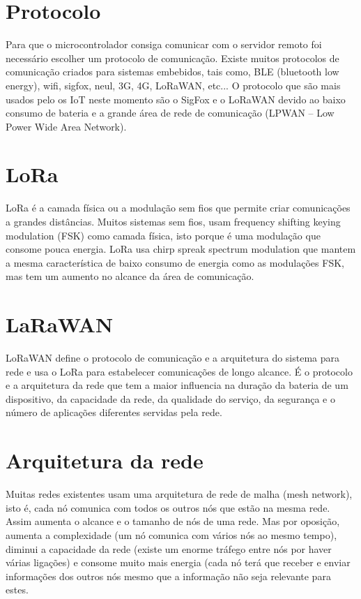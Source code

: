 \documentclass[a4paper]{article}
\begin{document}
\section{Protocolo}

Para que o microcontrolador consiga comunicar com o servidor remoto foi necessário escolher um protocolo de comunicação. Existe muitos protocolos de comunicação criados para sistemas embebidos, tais como, BLE (bluetooth low energy), wifi, sigfox, neul, 3G, 4G, LoRaWAN, etc...
O protocolo que são mais usados pelo os IoT neste momento são o SigFox e o LoRaWAN devido ao baixo consumo de bateria e a grande área de rede de comunicação (LPWAN – Low Power Wide Area Network).

\section{LoRa}

LoRa é a camada física ou a modulação sem fios que permite criar comunicações a grandes distâncias. Muitos sistemas sem fios, usam frequency shifting keying modulation (FSK) como camada física, isto porque é uma modulação que consome pouca energia. LoRa usa chirp spreak spectrum modulation que mantem a mesma característica de baixo consumo de energia como as modulações FSK, mas tem um aumento no alcance da área de comunicação.


\section{LaRaWAN}

LoRaWAN define o protocolo de comunicação e a arquitetura do sistema para rede e usa o LoRa para estabelecer comunicações de longo alcance. É o protocolo e a arquitetura da rede que tem a maior influencia na duração da bateria de um dispositivo, da capacidade da rede, da qualidade do serviço, da segurança e o número de aplicações diferentes servidas pela rede.

\section{Arquitetura da rede}
Muitas redes existentes usam uma arquitetura de rede de malha (mesh network), isto é, cada nó comunica com todos os outros nós que estão na mesma rede. Assim aumenta o alcance e o tamanho de nós de uma rede. Mas por oposição, aumenta a complexidade (um nó comunica com vários nós ao mesmo tempo), diminui a capacidade da rede (existe um enorme tráfego entre nós por haver várias ligações) e consome muito mais energia (cada nó terá que receber e enviar informações dos outros nós mesmo que a informação não seja relevante para estes. 
\end{document}
